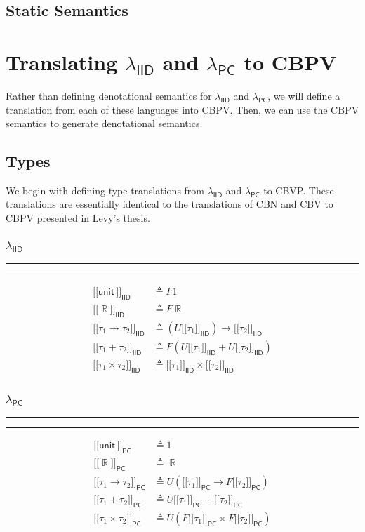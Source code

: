 \documentclass{article}
\DeclareMathOperator*\R{\mathbb{R}}
\newcommand{\iid}{\mathsf{IID}}
\newcommand{\pc}{\mathsf{PC}}
\newcommand{\unit}{\mathsf{unit\,}}
\newcommand{\1}{\mathsf{\,\#1\,}}
\newcommand{\2}{\mathsf{\,\#2\,}}
\newcommand{\semiid}[1]{[\![ #1 {]\!]}_{\mathsf{IID}}}
\newcommand{\sempc}[1]{[\![ #1 {]\!]}_{\mathsf{PC}}}
\begin{document}
\subsection{Static Semantics}

\newpage
\section{Translating $\lambda_{\iid}$ and $\lambda_{\pc}$ to CBPV}
Rather than defining denotational semantics for $\lambda_{\iid}$ and $\lambda_{\pc}$,
we will define a translation from each of these languages into CBPV.
Then, we can use the CBPV semantics to generate denotational semantics.

\subsection{Types}
We begin with defining type translations from $\lambda_{\iid}$ and $\lambda_{\pc}$ to CBVP.
These translations are essentially identical to the translations of CBN and CBV to CBPV presented in Levy's thesis.


\begin{multicols}{2}
\subsubsection*{$\lambda_\iid$}
\hrule\hrule
\medskip
	\begin{equation*}
		\begin{split}
			\semiid{\unit} &\triangleq F 1 \\
			\semiid{\R} &\triangleq F \R \\
			\semiid{\tau_1 \to \tau_2} &\triangleq (U \semiid{\tau_1}) \to \semiid{\tau_2} \\
			\semiid{\tau_1 + \tau_2} &\triangleq F(U \semiid{\tau_1} + U \semiid{\tau_2}) \\
			\semiid{\tau_1 \times \tau_2} &\triangleq \semiid{\tau_1} \times \semiid{\tau_2} \\
		\end{split}
	\end{equation*}
		
\subsubsection*{$\lambda_\pc$}
\hrule\hrule
\medskip
	\begin{equation*}
		\begin{split}
			\sempc{\unit} &\triangleq 1 \\
			\sempc{\R} &\triangleq \R \\
			\sempc{\tau_1 \to \tau_2} &\triangleq U (\sempc{\tau_1} \to F\sempc{\tau_2}) \\
			\sempc{\tau_1 + \tau_2} &\triangleq U\sempc{\tau_1} + \sempc{\tau_2} \\
			\sempc{\tau_1 \times \tau_2} &\triangleq U(F\sempc{\tau_1} \times F\sempc{\tau_2}) \\
		\end{split}
	\end{equation*}
\end{multicols}
\end{document}
